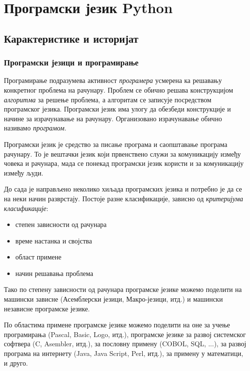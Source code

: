 \section{Програмски језик Python}

\subsection{Карактеристике и историјат}

\subsubsection{Програмски језици и програмирање}

Програмирање подразумева активност \emph{програмера} усмерена ка решавању конкретног проблема на рачунару. Проблем се обично решава конструкцијом \emph{алгоритма} за решење проблема, а алгоритам се записује посредством програмског језика. Програмски језик има улогу да обезбеди конструкције и начине за израчунавање на рачунару. Организовано израчунавање обично називамо \emph{програмом}.

Програмски језик је средство за писање програма и саопштавање програма рачунару. То је вештачки језик који првенствено служи за комуникацију између човека и рачунара, мада се понекад програмски језик користи и за комуникацију између људи.

До сада је направљено неколико хиљада програмских језика и потребно је да се на неки начин разврстају. Постоје разне класификације, зависно од \emph{критеријума класификације}:

\begin{itemize}
\item степен зависности од рачунара
\item време настанка и својства
\item област примене
\item начин решавања проблема
\end{itemize}

Тако по степену зависности од рачунара програмске језике можемо поделити на машински зависне (Асемблерски језици, Макро-језици, итд.) и машински независне програмске језике.

По областима примене програмске језике можемо поделити на оне за учење програмирања (Pascal, Basic, Logo, итд.), програмске језике за развој системског софтвера (C, Asembler, итд.), за пословну примену (COBOL, SQL, ...), за развој програма на интернету (Java, Java Script, Perl, итд.), за примену у математици, и друго.

